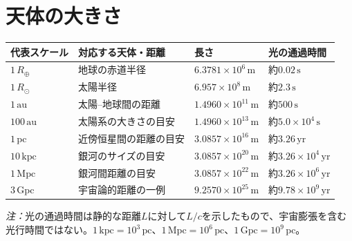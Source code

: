 \section{天体の大きさ}\label{sec:app-unit-sizes}
{\fontsize{9pt}{11pt}\selectfont
\begin{tabular}{@{}p{2.25cm}p{5.15cm}p{4.15cm}p{3.75cm}@{}}
\toprule
代表スケール & 対応する天体・距離 & 長さ & 光の通過時間 \\
\midrule
$1\,R_\oplus$ & 地球の赤道半径 & $6.3781\times10^6\,\mathrm m$ & 約$0.02\,\mathrm s$ \\
$1\,R_\odot$ & 太陽半径 & $6.957\times10^8\,\mathrm m$ & 約$2.3\,\mathrm s$ \\
$1\,\mathrm{au}$ & 太陽--地球間の距離 & $1.4960\times10^{11}\,\mathrm m$ & 約$500\,\mathrm s$ \\
$100\,\mathrm{au}$ & 太陽系の大きさの目安 & $1.4960\times10^{13}\,\mathrm m$ & 約$5.0\times10^4\,\mathrm s$ \\
$1\,\mathrm{pc}$ & 近傍恒星間の距離の目安 & $3.0857\times10^{16}\,\mathrm m$ & 約$3.26\,\mathrm{yr}$ \\
$10\,\mathrm{kpc}$ & 銀河のサイズの目安 & $3.0857\times10^{20}\,\mathrm m$ & 約$3.26\times10^4\,\mathrm{yr}$ \\
$1\,\mathrm{Mpc}$ & 銀河間距離の目安 & $3.0857\times10^{22}\,\mathrm m$ & 約$3.26\times10^6\,\mathrm{yr}$ \\
$3\,\mathrm{Gpc}$ & 宇宙論的距離の一例 & $9.2570\times10^{25}\,\mathrm m$ & 約$9.78\times10^9\,\mathrm{yr}$ \\
\bottomrule
\end{tabular}
}
\par\noindent\footnotesize\textit{注：}光の通過時間は静的な距離$L$に対して$L/c$を示したもので、宇宙膨張を含む光行時間ではない。$1\,\mathrm{kpc}=10^3\,\mathrm{pc}$、$1\,\mathrm{Mpc}=10^6\,\mathrm{pc}$、$1\,\mathrm{Gpc}=10^9\,\mathrm{pc}$。\normalsize

